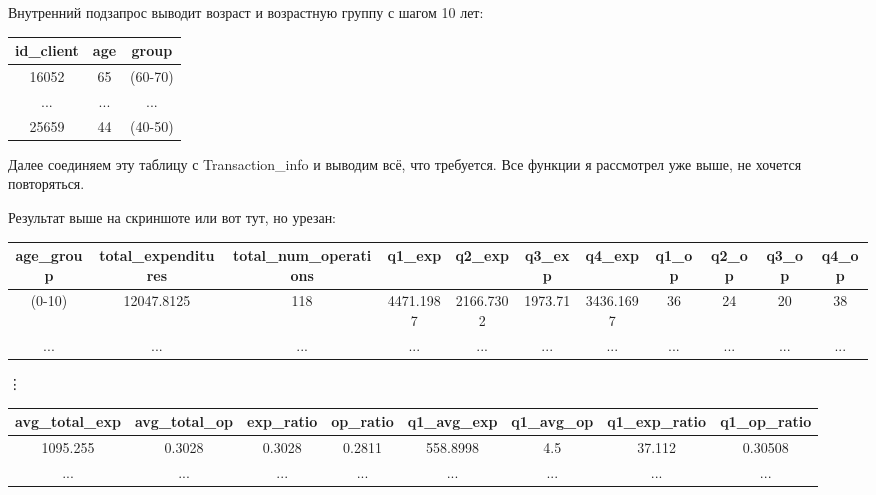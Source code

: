 \documentclass[12pt, a3paper]{article}
\begin{document}
\noindent
Внутренний подзапрос выводит возраст и возрастную группу с шагом 10 лет:
\begin{table}[!h]
    \begin{tabular}{|c|c|c|}
    \hline
    id\_client & age & group   \\ \hline
    16052      & 65  & (60-70) \\ \hline
    ...        & ... & ...     \\ \hline
    25659      & 44  & (40-50) \\ \hline
    \end{tabular}
\end{table}

\noindent
Далее соединяем  эту таблицу с Transaction\_info и выводим всё, что требуется. Все функции я 
рассмотрел уже выше, не хочется повторяться.

\noindent
Результат выше на скриншоте или вот тут, но урезан:
\begin{table}[!h]
    \begin{tabular}{|c|c|c|c|c|c|c|c|c|c|c|}
    \hline
    age\_group & total\_expenditures & total\_num\_operations & q1\_exp   & q2\_exp   & q3\_exp & q4\_exp   & q1\_op & q2\_op & q3\_op & q4\_op \\ \hline
    (0-10)     & 12047.8125          & 118                    & 4471.1987 & 2166.7302 & 1973.71 & 3436.1697 & 36     & 24     & 20     & 38     \\ \hline
    ...        & ...                 & ...                    & ...       & ...       & ...     & ...       & ...    & ...    & ...    & ...    \\ \hline
    \end{tabular}
\end{table}

\vdots

\begin{table}[!h]
    \begin{tabular}{|c|c|c|c|c|c|c|c|}
        \hline
        avg\_total\_exp    & avg\_total\_op     & exp\_ratio         & op\_ratio           & q1\_avg\_exp      & q1\_avg\_op & q1\_exp\_ratio    & q1\_op\_ratio      \\ \hline
        1095.255 & 0.3028 & 0.3028 & 0.2811 & 558.8998 & 4.5         & 37.112 & 0.30508 \\ \hline
        ...                & ...                & ...                & ...                 & ...               & ...         & ...               & ...                \\ \hline
    \end{tabular}
\end{table}
\end{document}
